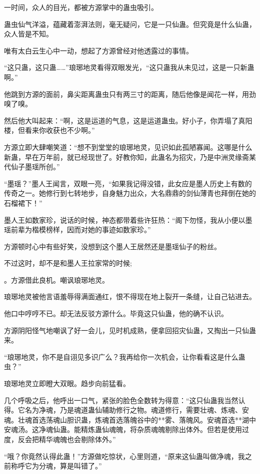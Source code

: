 
\begin{this_body}

一时间，众人的目光，都被方源掌中的蛊虫吸引。

蛊虫仙气洋溢，蕴藏着澎湃法则，毫无疑问，它是一只仙蛊。但究竟是什么仙蛊，众人皆是不知。

唯有太白云生心中一动，想起了方源曾经对他透露过的事情。

“这只蛊，这只蛊……”琅琊地灵看得双眼发光，“这只蛊我从未见过，这是一只新蛊啊。”

他跳到方源的面前，鼻尖距离蛊虫只有两三寸的距离，随后他像是闻花一样，用劲嗅了嗅。

然后他大叫起来：“啊，这是运道的气息，这是运道蛊虫。好小子，你弄塌了真阳楼，但看来你收获也不少啊。”

方源立即大肆嘲笑道：“想不到堂堂的琅琊地灵，见识如此孤陋寡闻。这哪是什么新蛊，早在万年前，就已经现世了。好教你知，此蛊名为招灾，乃是中洲灵缘斋某代仙子墨瑶所创。”

“墨瑶？”墨人王闻言，双眼一亮，“如果我记得没错，此女应是墨人历史上有数的传奇之一。她修行到七转地步，自身魅力出众，大名鼎鼎的剑仙薄青也拜倒在她的石榴裙下！”

墨人王如数家珍，说话的时候，神态都带着些许狂热：“阁下勿怪，我从小便以墨瑶前辈为楷模榜样，因而对她的事迹如数家珍。”

方源顿时心中有些好笑，没想到这个墨人王居然还是墨瑶仙子的粉丝。

不过这时，却不是和墨人王拉家常的时候;

。方源借此良机。嘲讽琅琊地灵。

琅琊地灵被他言语羞辱得满面通红，恨不得现在地上裂开一条缝，让自己钻进去。

他口中哼哼不已。却无法反驳方源什么。毕竟这只仙蛊，他的确不认识。

方源阴阳怪气地嘲讽了好一会儿，见时机成熟，便拿回招灾仙蛊，又掏出一只仙蛊来。

“琅琊地灵，你不是自诩见多识广么？我再给你一次机会，让你看看这是什么蛊虫？”

琅琊地灵立即瞪大双眼。趋步向前猛看。

几个呼吸之后，他呼出一口气，紧张的脸色全数转为得意：“这只仙蛊我当然认得。它名为净魂，乃是魂道蛊仙辅助修行之物。魂道修行，需要壮魂、炼魂、安魂。壮魂首选荡魂山胆识蛊，炼魂首选落魄谷中的**雾、落魄风。安魂首选**湖中安魂汤。这净魂仙蛊。能精炼蛊仙魂魄，将杂质魂魄剔除出体外。但若是使用过度，反会把精华魂魄也会剔除体外。”

“哦？你竟然认得此蛊！”方源做吃惊状，心里则道，“原来这仙蛊叫做净魂，我之前称呼它为分魂，算是叫错了。”


\end{this_body}
